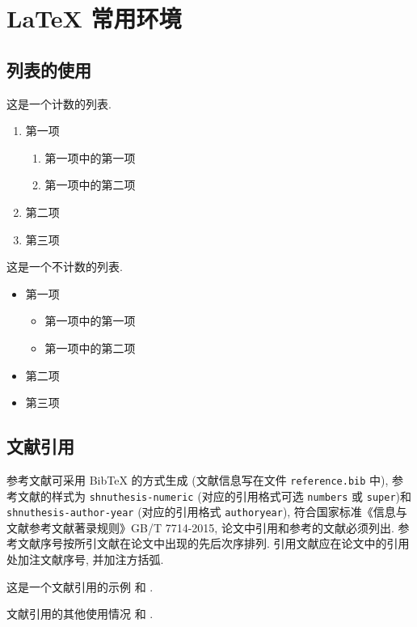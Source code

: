 

\chapter{LaTeX 常用环境}\label{chap:LaTeXEnv}

\section{列表的使用}

这是一个计数的列表.
\begin{enumerate}%
  \item 第一项
    \begin{enumerate}
      \item 第一项中的第一项
      \item 第一项中的第二项
    \end{enumerate}
  \item 第二项
  \item 第三项
\end{enumerate}

这是一个不计数的列表.
\begin{itemize}%
  \item 第一项
  \begin{itemize}
    \item 第一项中的第一项
    \item 第一项中的第二项
  \end{itemize}
  \item 第二项
  \item 第三项
\end{itemize}


\section{文献引用}

参考文献可采用 BibTeX 的方式生成 (文献信息写在文件 \verb|reference.bib| 中), 参考文献的样式为 \verb|shnuthesis-numeric| (对应的引用格式可选 \verb|numbers| 或  \verb|super|)和 \verb|shnuthesis-author-year| (对应的引用格式 \verb|authoryear|), 符合国家标准《信息与文献参考文献著录规则》GB/T 7714-2015, 论文中引用和参考的文献必须列出. 参考文献序号按所引文献在论文中出现的先后次序排列. 引用文献应在论文中的引用处加注文献序号, 并加注方括弧.

这是一个文献引用的示例 \cite{Tadmor2012} 和 \cite{LiLiu1997,Adams2003,TreWei2014}.

文献引用的其他使用情况 \cite[定理~1.1]{LiLiu1997} 和 \cite{Shen1994,LiuEtAl2024}.


